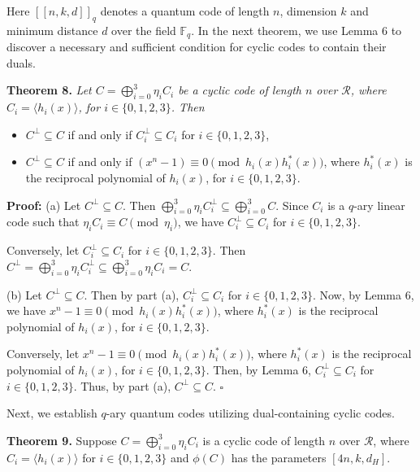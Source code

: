 \documentclass[12pt]{article}
\begin{document}
Here $[[n, k, d]]_q$ denotes a quantum code of length $n$, dimension $k$ and minimum distance $d$ over the field $\mathbb{F}_q$. In the next theorem, we use Lemma 6 to discover a necessary and sufficient condition for cyclic codes to contain their duals.

\textbf{Theorem 8.} \textit{Let $C = \bigoplus_{i=0}^3 \eta_i C_i$ be a cyclic code of length $n$ over $\mathcal{R}$, where $C_i = \langle h_i(x) \rangle$, for $i \in \{0, 1, 2, 3\}$. Then}

\begin{itemize}
    \item[(a)] $C^{\perp} \subseteq C$ if and only if $C_i^{\perp} \subseteq C_i$ for $i \in \{0, 1, 2, 3\}$,
    \item[(b)] $C^{\perp} \subseteq C$ if and only if $(x^n - 1) \equiv 0 \pmod{h_i(x) h_i^*(x)}$, where $h_i^*(x)$ is the reciprocal polynomial of $h_i(x)$, for $i \in \{0, 1, 2, 3\}$.
\end{itemize}
\textbf{Proof:} (a) Let $C^{\perp} \subseteq C$. Then $\displaystyle \bigoplus_{i=0}^3 \eta_i C_i^{\perp} \subseteq \bigoplus_{i=0}^3 C$. Since $C_i$ is a $q$-ary linear code such that $\eta_i C_i \equiv C \pmod{\eta_i}$, we have $C_i^{\perp} \subseteq C_i$ for $i \in \{0,1,2,3\}$.

Conversely, let $C_i^{\perp} \subseteq C_i$ for $i \in \{0,1,2,3\}$. Then $C^{\perp} = \bigoplus_{i=0}^3 \eta_i C_i^{\perp} \subseteq \bigoplus_{i=0}^3 \eta_i C_i = C$.

(b) Let $C^{\perp} \subseteq C$. Then by part (a), $C_i^{\perp} \subseteq C_i$ for $i \in \{0,1,2,3\}$. Now, by Lemma 6, we have $x^n - 1 \equiv 0 \pmod{h_i(x) h_i^*(x)}$, where $h_i^*(x)$ is the reciprocal polynomial of $h_i(x)$, for $i \in \{0,1,2,3\}$.

Conversely, let $x^n - 1 \equiv 0 \pmod{h_i(x) h_i^*(x)}$, where $h_i^*(x)$ is the reciprocal polynomial of $h_i(x)$, for $i \in \{0,1,2,3\}$. Then, by Lemma 6, $C_i^{\perp} \subseteq C_i$ for $i \in \{0,1,2,3\}$. Thus, by part (a), $C^{\perp} \subseteq C$. \hfill $\square$

\medskip

Next, we establish $q$-ary quantum codes utilizing dual-containing cyclic codes.

\medskip
\noindent
\textbf{Theorem 9.} Suppose $C = \bigoplus_{i=0}^3 \eta_i C_i$ is a cyclic code of length $n$ over $\mathcal{R}$, where $C_i = \langle h_i(x) \rangle$ for $i \in \{0,1,2,3\}$ and $\phi(C)$ has the parameters $[4n, k, d_H]$.
\end{document}
